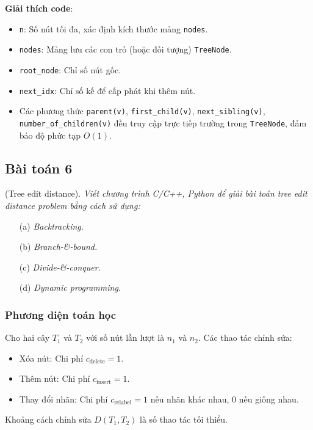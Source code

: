 \documentclass[a4paper,12pt]{article}
\begin{document}
\textbf{Giải thích code}:
\begin{itemize}
  \item \texttt{n}: Số nút tối đa, xác định kích thước mảng \texttt{nodes}.
  \item \texttt{nodes}: Mảng lưu các con trỏ (hoặc đối tượng) \texttt{TreeNode}.
  \item \texttt{root\_node}: Chỉ số nút gốc.
  \item \texttt{next\_idx}: Chỉ số kế để cấp phát khi thêm nút.
  \item Các phương thức \texttt{parent(v)}, \texttt{first\_child(v)}, \texttt{next\_sibling(v)}, \texttt{number\_of\_children(v)} đều truy cập trực tiếp trường trong \texttt{TreeNode}, đảm bảo độ phức tạp \(O(1)\).
\end{itemize}

\subsection{Bài toán 6} (Tree edit distance). \textit{Viết chương trình C/C++, Python để giải bài toán tree edit distance problem bằng cách sử dụng:}
\begin{itemize}
    \item[(a)] \textit{Backtracking.}
    \item[(b)] \textit{Branch-\&-bound.}
    \item[(c)] \textit{Divide-\&-conquer.}
    \item[(d)] \textit{Dynamic programming.}
\end{itemize}

\subsubsection{Phương diện toán học}

Cho hai cây \( T_1 \) và \( T_2 \) với số nút lần lượt là \( n_1 \) và \( n_2 \). Các thao tác chỉnh sửa:
\begin{itemize}
    \item Xóa nút: Chi phí \( c_{\text{delete}} = 1 \).
    \item Thêm nút: Chi phí \( c_{\text{insert}} = 1 \).
    \item Thay đổi nhãn: Chi phí \( c_{\text{relabel}} = 1 \) nếu nhãn khác nhau, 0 nếu giống nhau.
\end{itemize}
Khoảng cách chỉnh sửa \( D(T_1, T_2) \) là số thao tác tối thiểu.
\end{document}
